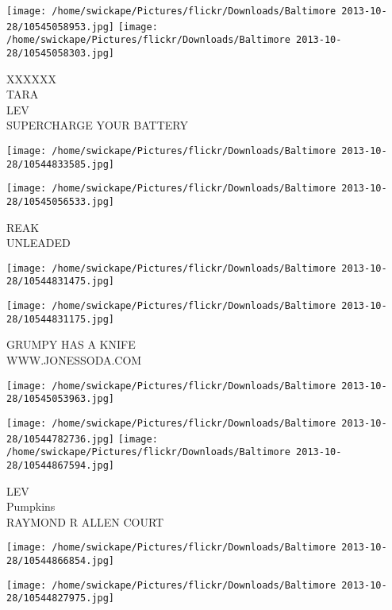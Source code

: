 \documentclass[10pt,letterpaper]{article}
\begin{document}
\texttt{[image: /home/swickape/Pictures/flickr/Downloads/Baltimore 2013-10-28/10545058953.jpg]}
\texttt{[image: /home/swickape/Pictures/flickr/Downloads/Baltimore 2013-10-28/10545058303.jpg]}

XXXXXX\\
TARA\\
LEV\\
SUPERCHARGE YOUR BATTERY\\
\pagebreak

\texttt{[image: /home/swickape/Pictures/flickr/Downloads/Baltimore 2013-10-28/10544833585.jpg]}

\vspace{0.25in}
\texttt{[image: /home/swickape/Pictures/flickr/Downloads/Baltimore 2013-10-28/10545056533.jpg]}

REAK\\
UNLEADED\\
\pagebreak

\texttt{[image: /home/swickape/Pictures/flickr/Downloads/Baltimore 2013-10-28/10544831475.jpg]}

\vspace{0.25in}
\texttt{[image: /home/swickape/Pictures/flickr/Downloads/Baltimore 2013-10-28/10544831175.jpg]}

GRUMPY HAS A KNIFE\\
WWW.JONESSODA.COM\\
\pagebreak

\texttt{[image: /home/swickape/Pictures/flickr/Downloads/Baltimore 2013-10-28/10545053963.jpg]}

\vspace{0.25in}
\texttt{[image: /home/swickape/Pictures/flickr/Downloads/Baltimore 2013-10-28/10544782736.jpg]}
\texttt{[image: /home/swickape/Pictures/flickr/Downloads/Baltimore 2013-10-28/10544867594.jpg]}

LEV\\
Pumpkins\\
RAYMOND R ALLEN COURT\\
\pagebreak

\texttt{[image: /home/swickape/Pictures/flickr/Downloads/Baltimore 2013-10-28/10544866854.jpg]}

\vspace{0.25in}
\texttt{[image: /home/swickape/Pictures/flickr/Downloads/Baltimore 2013-10-28/10544827975.jpg]}
\end{document}
